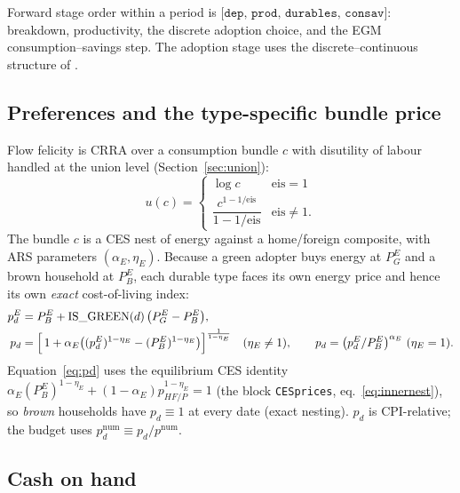 \documentclass[11pt]{article}
\newcommand{\num}{\mathrm{num}}
\newcommand{\PEB}{P^{E}_{B}}
\newcommand{\PEG}{P^{E}_{G}}
\newcommand{\pE}{p^{E}}
\begin{document}
Forward stage order within a period is
$\texttt{[dep, prod, durables, consav]}$: breakdown, productivity, the discrete
adoption choice, and the EGM consumption--savings step. The adoption stage uses
the discrete--continuous structure of \cite{DCEGM2017}.

\subsection{Preferences and the type-specific bundle price}

Flow felicity is CRRA over a consumption bundle $c$ with disutility of labour
handled at the union level (Section~\ref{sec:union}):
\begin{equation}
u(c)=\begin{cases}\log c & \text{eis}=1\\[2pt]
\dfrac{c^{1-1/\text{eis}}}{1-1/\text{eis}} & \text{eis}\neq 1.\end{cases}
\end{equation}
The bundle $c$ is a CES nest of energy against a home/foreign composite, with
ARS parameters $(\alpha_E,\eta_E)$. Because a green adopter buys energy at $\PEG$
and a brown household at $\PEB$, each durable type faces its own energy price and
hence its own \emph{exact} cost-of-living index:
\begin{align}
\pE_d &= \PEB + \mathrm{IS\_GREEN}(d)\,\bigl(\PEG-\PEB\bigr),\\
p_d &= \Bigl[\,1+\alpha_E\bigl((\pE_d)^{1-\eta_E}-(\PEB)^{1-\eta_E}\bigr)\Bigr]^{\frac{1}{1-\eta_E}}
\quad(\eta_E\neq 1),\qquad
p_d=\bigl(\pE_d/\PEB\bigr)^{\alpha_E}\ (\eta_E=1).
\label{eq:pd}
\end{align}
Equation~\eqref{eq:pd} uses the equilibrium CES identity
$\alpha_E(\PEB)^{1-\eta_E}+(1-\alpha_E)p_{HF/P}^{1-\eta_E}=1$
(the block \texttt{CESprices}, eq.~\eqref{eq:innernest}), so \emph{brown}
households have $p_d\equiv 1$ at every date (exact nesting). $p_d$ is
CPI-relative; the budget uses $p_d^{\num}\equiv p_d/p^{\num}$.

\subsection{Cash on hand}\label{sec:coh}
\end{document}
